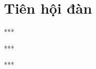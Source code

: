 \chapter{Tiên hội đàn}



\begin{center}
  ***
\end{center}



\begin{center}
  ***
\end{center}



\begin{center}
  ***
\end{center}
